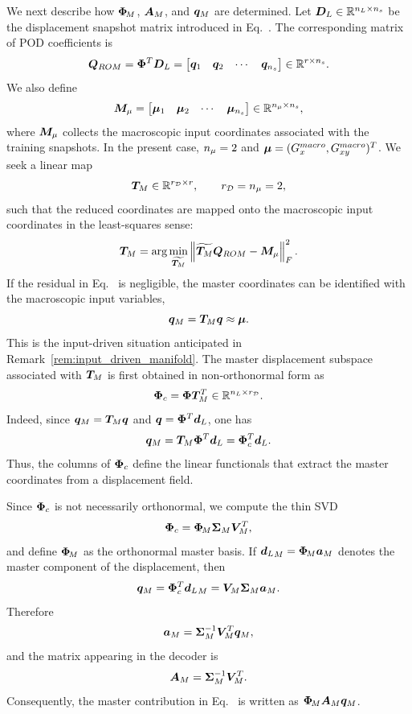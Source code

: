\documentclass[11pt,a4paper]{article}
\begin{document}
We next describe how $\bm{\Phi}_{\!M}$, $\bm{A}_{M}$, and $\bm{q}_M$ are determined. Let
$\bm{D}_L\in\mathbb{R}^{n_L\times n_s}$ be the displacement snapshot matrix
introduced in Eq.~. The corresponding matrix of POD
coefficients is
\[
    \bm{Q}_{ROM}
    =
    \bm{\Phi}^T \bm{D}_L
    =
    \begin{bmatrix}
    \bm{q}_1 & \bm{q}_2 & \cdots & \bm{q}_{n_s}
    \end{bmatrix}
    \in\mathbb{R}^{r\times n_s}.
\]
We also define
\[
    \bm{M}_{\mu}
    =
    \begin{bmatrix}
    \bm{\mu}_1 & \bm{\mu}_2 & \cdots & \bm{\mu}_{n_s}
    \end{bmatrix}
    \in\mathbb{R}^{n_{\mu}\times n_s},
\]
where $\bm{M}_{\mu}$ collects the macroscopic input coordinates associated with the
training snapshots. In the present case, $n_{\mu}=2$ and
$\bm{\mu}=(G_x^{macro},G_{xy}^{macro})^T$. We seek a linear map
\[
    \bm{T}_{M}\in\mathbb{R}^{r_{\mathcal{D}}\times r},
    \qquad
    r_{\mathcal{D}}=n_{\mu}=2,
\]
such that the reduced coordinates are mapped onto the macroscopic input
coordinates in the least-squares sense:
\begin{equation}
\label{eq:least_squares_master_coordinates}
    \bm{T}_{M}
    =
    \arg\min_{\widetilde{\bm{T}_{M}}}
    \left\|
    \widetilde{\bm{T}_{M}}\bm{Q}_{ROM}-\bm{M}_{\mu}
    \right\|_F^2 .
\end{equation}
If the residual in Eq.~ is
negligible, the master coordinates can be identified with the macroscopic
input variables,
\begin{equation}
\label{eq:inpdriven}
    \bm{q}_M=\bm{T}_{M}\bm{q}\approx\bm{\mu} .
\end{equation}
This is the input-driven situation anticipated in
Remark~\ref{rem:input_driven_manifold}.  The master displacement subspace associated with $\bm{T}_{M}$ is first obtained in
non-orthonormal form as
\begin{equation}
\label{eq:Phic_definition}
    \bm{\Phi}_{c}
    =
    \bm{\Phi}\bm{T}_{M}^T
    \in\mathbb{R}^{n_L\times r_{\mathcal{D}}}.
\end{equation}
Indeed, since $\bm{q}_M=\bm{T}_{M}\bm{q}$ and $\bm{q}=\bm{\Phi}^T\bm{d}_L$, one has
\[
    \bm{q}_M
    =
    \bm{T}_{M}\bm{\Phi}^T\bm{d}_L
    =
    \bm{\Phi}_{c}^T\bm{d}_L .
\]
Thus, the columns of $\bm{\Phi}_{c}$ define the linear functionals that extract the
master coordinates from a displacement field.

 Since $\bm{\Phi}_{c}$ is not necessarily orthonormal, we compute the thin SVD
\[
    \bm{\Phi}_{c}=\bm{\Phi}_{\!M}\bm{\Sigma}_{M}\bm{V}_{M}^T,
\]
and define $\bm{\Phi}_{\!M}$ as the orthonormal master basis. If
${\bm{d}_L}_M=\bm{\Phi}_{\!M}\bm{a}_M$ denotes the master component of the displacement, then
\[
    \bm{q}_M
    =
    \bm{\Phi}_{c}^T{\bm{d}_L}_M
    =
    \bm{V}_{M}\bm{\Sigma}_{M}\bm{a}_M .
\]
Therefore
\[
    \bm{a}_M
    =
    \bm{\Sigma}_{M}^{-1}\bm{V}_{M}^T\bm{q}_M,
\]
and the matrix appearing in the decoder is
\begin{equation}
\label{eq:Am_definition}
    \bm{A}_{M}
    =
    \bm{\Sigma}_{M}^{-1}\bm{V}_{M}^T .
\end{equation}
Consequently, the master contribution in
Eq.~ is written as
$\bm{\Phi}_{\!M}\bm{A}_{M}\bm{q}_M$.
\end{document}
